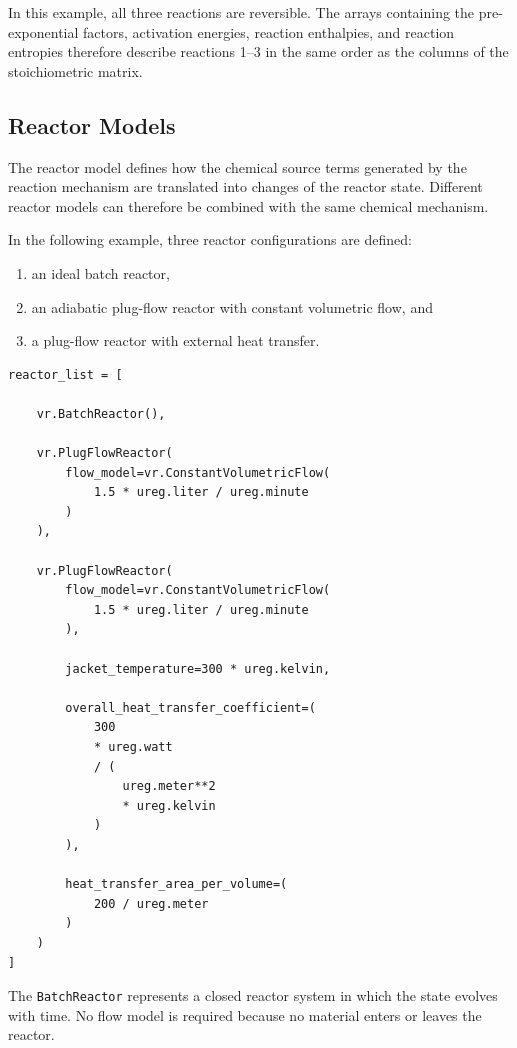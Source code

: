 In this example, all three reactions are reversible. The arrays containing
the pre-exponential factors, activation energies, reaction enthalpies, and
reaction entropies therefore describe reactions 1--3 in the same order as
the columns of the stoichiometric matrix.



\subsection{Reactor Models}

The reactor model defines how the chemical source terms generated by the
reaction mechanism are translated into changes of the reactor state.
Different reactor models can therefore be combined with the same chemical
mechanism.

In the following example, three reactor configurations are defined:

\begin{enumerate}
    \item an ideal batch reactor,
    \item an adiabatic plug-flow reactor with constant volumetric flow, and
    \item a plug-flow reactor with external heat transfer.
\end{enumerate}

\begin{verbatim}
reactor_list = [

    vr.BatchReactor(),

    vr.PlugFlowReactor(
        flow_model=vr.ConstantVolumetricFlow(
            1.5 * ureg.liter / ureg.minute
        )
    ),

    vr.PlugFlowReactor(
        flow_model=vr.ConstantVolumetricFlow(
            1.5 * ureg.liter / ureg.minute
        ),

        jacket_temperature=300 * ureg.kelvin,

        overall_heat_transfer_coefficient=(
            300
            * ureg.watt
            / (
                ureg.meter**2
                * ureg.kelvin
            )
        ),

        heat_transfer_area_per_volume=(
            200 / ureg.meter
        )
    )
]
\end{verbatim}

The \texttt{BatchReactor} represents a closed reactor system in which the
state evolves with time. No flow model is required because no material enters
or leaves the reactor.

